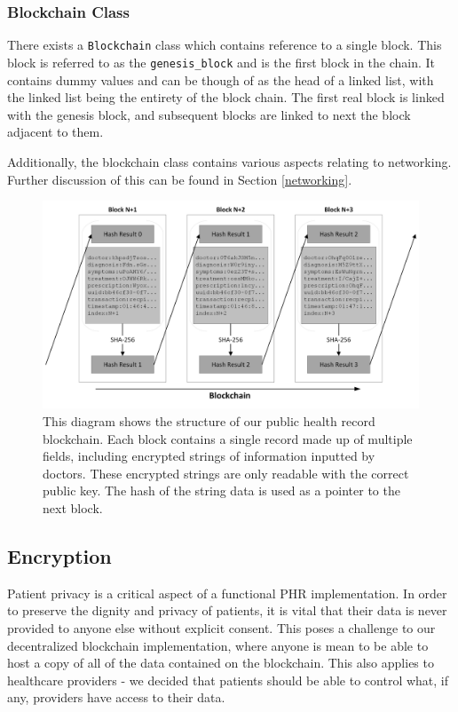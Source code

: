 \documentclass{article}
\begin{document}
\subsubsection{Blockchain Class}
There exists a \texttt{Blockchain} class which contains reference to a single block. This block is referred to as the \texttt{genesis\_block} and is the first block in the chain. It contains dummy values and can be though of as the head of a linked list, with the linked list being the entirety of the block chain. The first real block is linked with the genesis block, and subsequent blocks are linked to next the block adjacent to them.

Additionally, the blockchain class contains various aspects relating to networking. Further discussion of this can be found in Section \ref{networking}. 

\begin{figure}[h]
\centering
\includegraphics[width=\textwidth]{images/4990_blockchain_structure.png}
\caption{This diagram shows the structure of our public health record blockchain. Each block contains a single record made up of multiple fields, including encrypted strings of information inputted by doctors. These encrypted strings are only readable with the correct public key. The hash of the string data is used as a pointer to the next block.}
\label{fig:encryption_encryption}
\end{figure}


\subsection{Encryption}
Patient privacy is a critical aspect of a functional PHR implementation. In order to preserve the dignity and privacy of patients, it is vital that their data is never provided to anyone else without explicit consent. This poses a challenge to our decentralized blockchain implementation, where anyone is mean to be able to host a copy of all of the data contained on the blockchain. This also applies to healthcare providers - we decided that patients should be able to control what, if any, providers have access to their data.
\end{document}
